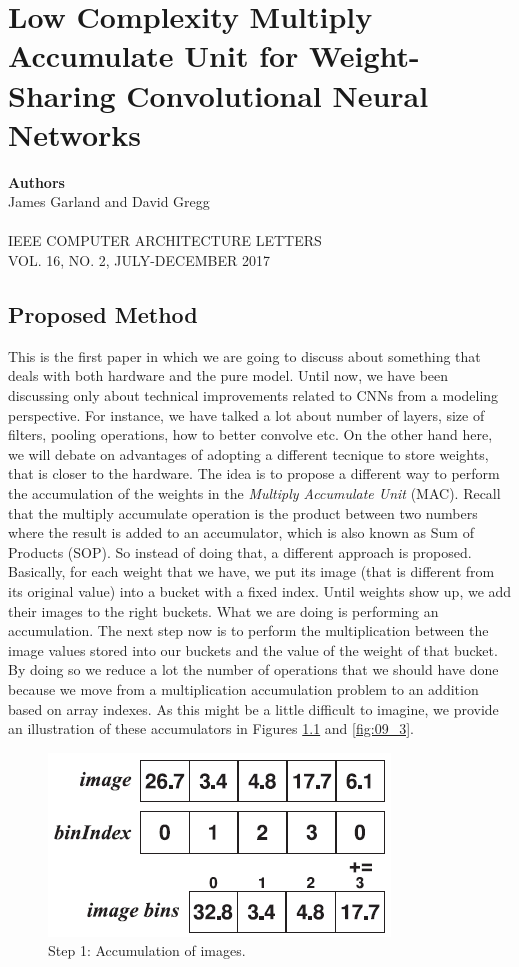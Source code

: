 \chapter{Low Complexity Multiply Accumulate Unit for Weight-Sharing Convolutional Neural Networks}

{\small \textbf{Authors}\\
James Garland and David Gregg\\ \\
IEEE COMPUTER ARCHITECTURE LETTERS\\VOL. 16, NO. 2, JULY-DECEMBER 2017}

\section{Proposed Method}

This is the first paper in which we are going to discuss about something that deals with both hardware and the pure model. Until now, we have been discussing only about technical improvements related to CNNs from a modeling perspective. For instance, we have talked a lot about number of layers, size of filters, pooling operations, how to better convolve etc. On the other hand here, we will debate on advantages of adopting a different tecnique to store weights, that is closer to the hardware. The idea is to propose a different way to perform the accumulation of the weights in the \textit{Multiply Accumulate Unit} (MAC). Recall that the multiply accumulate operation is the product between two numbers where the result is added to an accumulator, which is also known as Sum of Products (SOP). So instead of doing that, a different approach is proposed. Basically, for each weight that we have, we put its image (that is different from its original value) into a bucket with a fixed index. Until weights show up, we add their images to the right buckets. What we are doing is performing an accumulation. The next step now is to perform the multiplication between the image values stored into our buckets and the value of the weight of that bucket. By doing so we reduce a lot the number of operations that we should have done because we move from a multiplication accumulation problem to an addition based on array indexes. As this might be a little difficult to imagine, we provide an illustration of these accumulators in Figures \ref{fig:09_2} and \ref{fig:09_3}.\\

\begin{figure}[h!]
    \centering
    \includegraphics[scale=0.70]{images/09_2.png}
    \caption{Step 1: Accumulation of images.}
    \label{fig:09_2}
\end{figure}

